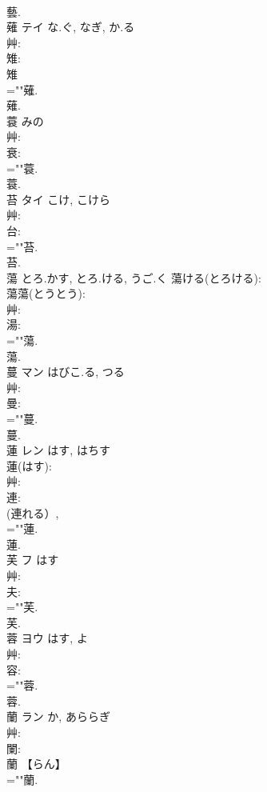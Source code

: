 \documentclass[8pt]{extreport}
\begin{document}
\begin{CJK}{UTF8}{min}
\\	藝.
\\	薙	テイ	な.ぐ, なぎ, か.る		
\\	艸: 
\\	雉: 
\\	雉 
\\	=""薙.
\\	薙.
\\	蓑		みの				
\\	艸: 
\\	衰: 
\\	=""蓑.
\\	蓑.
\\	苔	タイ	こけ, こけら		
\\	艸: 
\\	台: 
\\	=""苔.
\\	苔.
\\	蕩		とろ.かす, とろ.ける, うご.く			蕩ける(とろける): 
\\	蕩蕩(とうとう): 
\\	艸: 
\\	湯: 
\\	=""蕩.
\\	蕩.
\\	蔓	マン	はびこ.る, つる		
\\	艸: 
\\	曼: 
\\	=""蔓.
\\	蔓.
\\	蓮	レン	はす, はちす		
\\	蓮(はす): 
\\	艸: 
\\	連: 
\\	(連れる）, 
\\	=""蓮.
\\	蓮.
\\	芙	フ		はす	
\\	艸: 
\\	夫: 
\\	=""芙.
\\	芙.
\\	蓉	ヨウ		はす, よ	
\\	艸: 
\\	容: 
\\	=""蓉.
\\	蓉.
\\	蘭	ラン		か, あららぎ	
\\	艸: 
\\	闌: 
\\	蘭 【らん】
\\	=""蘭.

\end{CJK}
\end{document}
